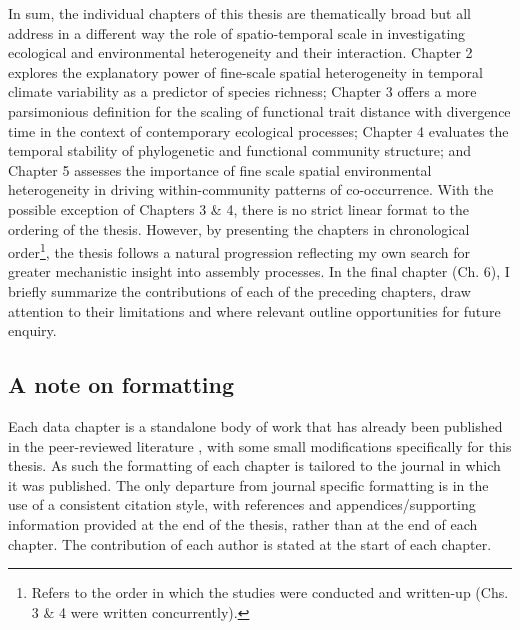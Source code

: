 In sum, the individual chapters of this thesis are thematically broad but all address in a different way the role of spatio-temporal scale in investigating ecological and environmental heterogeneity and their interaction. Chapter 2 explores the explanatory power of fine-scale spatial heterogeneity in temporal climate variability as a predictor of species richness; Chapter 3 offers a more parsimonious definition for the scaling of functional trait distance with divergence time in the context of contemporary ecological processes; Chapter 4 evaluates the temporal stability of phylogenetic and functional community structure; and Chapter 5 assesses the importance of fine scale spatial environmental heterogeneity in driving within-community patterns of co-occurrence. With the possible exception of Chapters 3 \& 4, there is no strict linear format to the ordering of the thesis. However, by presenting the chapters in chronological order\footnote{Refers to the order in which the studies were conducted and written-up (Chs. 3 \& 4 were written concurrently).}, the thesis follows a natural progression reflecting my own search for greater mechanistic insight into assembly processes. In the final chapter (Ch. 6), I briefly summarize the contributions of each of the preceding chapters, draw attention to their limitations and where relevant outline opportunities for future enquiry.   

\subsection*{A note on formatting}

Each data chapter is a standalone body of work that has already been published in the peer-reviewed literature \citep[Chapters 2-5;][]{Letten2013, Letten2014, Letten2014a, Letten2015}, with some small modifications specifically for this thesis. As such the formatting of each chapter is tailored to the journal in which it was published. The only departure from journal specific formatting is in the use of a consistent citation style, with references and appendices/supporting information provided at the end of the thesis, rather than at the end of each chapter.  The contribution of each author is stated at the start of each chapter.   

